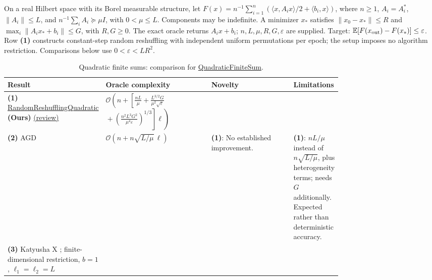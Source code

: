 \begin{table}[tp]
\centering
\caption{Quadratic finite sums: comparison for \href{https://github.com/k3nfalt/longtails/blob/main/LongTails/Setups/QuadraticFiniteSum.lean}{QuadraticFiniteSum}.}\label{tab:QuadraticFiniteSum}
\parbox{\linewidth}{\footnotesize On a real Hilbert space with its Borel measurable structure, let $F(x)=n^{-1}\sum_{i=1}^n(\langle x,A_i x\rangle/2+\langle b_i,x\rangle)$, where $n\ge1$, $A_i=A_i^*$, $\|A_i\|\le L$, and $n^{-1}\sum_i A_i\succeq\mu I$, with $0<\mu\le L$. Components may be indefinite. A minimizer $x_*$ satisfies $\|x_0-x_*\|\le R$ and $\max_i\|A_ix_*+b_i\|\le G$, with $R,G\ge0$. The exact oracle returns $A_ix+b_i$; $n,L,\mu,R,G,\varepsilon$ are supplied. Target: $\mathbb E[F(x_{\rm out})-F(x_*)]\le\varepsilon$. Row \textbf{(1)} constructs constant-step random reshuffling with independent uniform permutations per epoch; the setup imposes no algorithm restriction. Comparisons below use $0<\varepsilon<LR^2$.}\par\smallskip
\begin{threeparttable}
\footnotesize
\setlength{\tabcolsep}{4pt}\renewcommand{\arraystretch}{1.25}
\begin{tabularx}{\linewidth}{@{}>{\raggedright\arraybackslash}p{0.20\linewidth}>{\raggedright\arraybackslash}p{0.32\linewidth}>{\raggedright\arraybackslash}p{0.25\linewidth}>{\raggedright\arraybackslash}X@{}}
\toprule
\textbf{Result} & \textbf{Oracle complexity} & \textbf{Novelty} & \textbf{Limitations} \\
\midrule
\textbf{(1)} \href{https://github.com/k3nfalt/longtails/blob/main/LongTails/Theorems/RandomReshufflingQuadratic.lean}{Random\allowbreak Reshuffling\allowbreak Quadratic} \textbf{(Ours)} \href{https://github.com/k3nfalt/longtails/blob/main/scripts/reviews/RandomReshufflingQuadratic.md}{(review)}
& $\displaystyle\mathcal{O}\!\left(n+\left[\frac{nL}{\mu}+\frac{L^{3/2}G}{\mu^2\sqrt\varepsilon}\right.\right.$\newline
$\displaystyle\left.\left.{}+\left(\frac{n^2L^3G^2}{\mu^4\varepsilon}\right)^{1/3}\right]\ell\right)$
& & \\
\midrule[1.2pt]
\textbf{(2)} AGD \citep[Thm.~3.18]{qfsBubeck2015}
& $\mathcal{O}(n+n\sqrt{L/\mu}\,\ell)$
& \textbf{(1)}: No established improvement.
& \textbf{(1)}: $nL/\mu$ instead of $n\sqrt{L/\mu}$, plus heterogeneity terms; needs $G$ additionally. Expected rather than deterministic accuracy. \\
\midrule
\textbf{(3)} Katyusha X \citep[Cor.~4.4, v1]{qfsAllenZhu2018v1}; finite-dimensional restriction, $b=1$, $\ell_1=\ell_2=L$

\end{tabularx}
\end{threeparttable}
\end{table}
